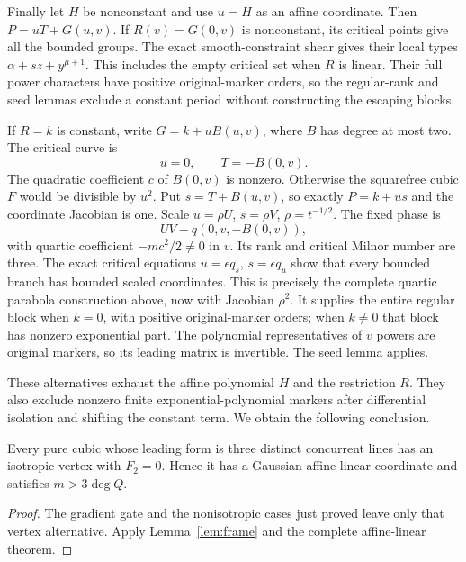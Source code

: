 Finally let $H$ be nonconstant and use $u=H$ as an affine
coordinate. Then $P=uT+G(u,v)$. If $R(v)=G(0,v)$ is
nonconstant, its critical points give all the bounded groups.
The exact smooth-constraint shear gives their local types
$\alpha+s z+y^{\mu+1}$. This includes the empty critical set
when $R$ is linear. Their full power characters have positive
original-marker orders, so the regular-rank and seed lemmas
exclude a constant period without constructing the escaping
blocks.

If $R=k$ is constant, write $G=k+uB(u,v)$, where $B$ has
degree at most two. The critical curve is
\[
 u=0,\qquad T=-B(0,v).
\]
The quadratic coefficient $c$ of $B(0,v)$ is nonzero.
Otherwise the squarefree cubic $F$ would be divisible by $u^2$.
Put $s=T+B(u,v)$, so exactly $P=k+us$ and the coordinate
Jacobian is one. Scale $u=\rho U$, $s=\rho V$,
$\rho=t^{-1/2}$. The fixed phase is
\[
 UV-q(0,v,-B(0,v)),
\]
with quartic coefficient $-mc^2/2\ne0$ in $v$. Its rank and
critical Milnor number are three. The exact critical equations
$u=\epsilon q_s$, $s=\epsilon q_u$ show that every bounded
branch has bounded scaled coordinates. This is precisely the
complete quartic parabola construction above, now with
Jacobian $\rho^2$. It supplies the entire regular block when
$k=0$, with positive original-marker orders; when $k\ne0$
that block has nonzero exponential part. The polynomial
representatives of $v$ powers are original markers, so its
leading matrix is invertible. The seed lemma applies.

These alternatives exhaust the affine polynomial $H$ and the
restriction $R$. They also exclude nonzero finite
exponential-polynomial markers after differential isolation and
shifting the constant term. We obtain the following conclusion.

\begin{proposition}\label{prop:concurrentcomplete}
Every pure cubic whose leading form is three distinct concurrent
lines has an isotropic vertex with $F_2=0$. Hence it has a
Gaussian affine-linear coordinate and satisfies $m>3\deg Q$.
\end{proposition}
\begin{proof}
The gradient gate and the nonisotropic cases just proved leave
only that vertex alternative. Apply Lemma~\ref{lem:frame} and
the complete affine-linear theorem.
\end{proof}
